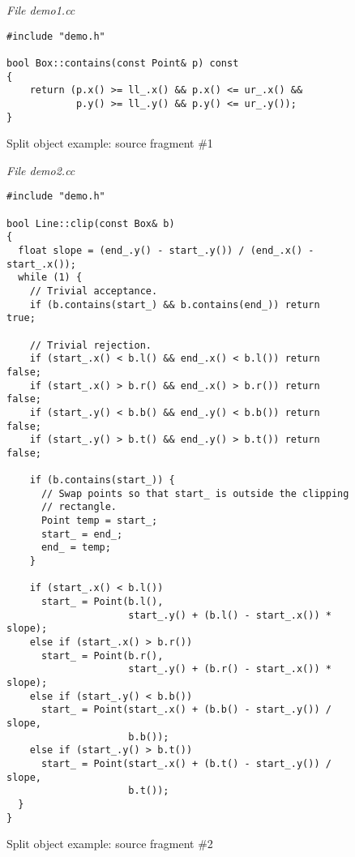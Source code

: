 \vspace{2cm}
\begin{figure}[ht]
\textit{File demo1.cc}
\begin{lstlisting}
#include "demo.h"

bool Box::contains(const Point& p) const
{
    return (p.x() >= ll_.x() && p.x() <= ur_.x() &&
            p.y() >= ll_.y() && p.y() <= ur_.y());
}
\end{lstlisting}
\caption{Split object example: source fragment \#1}
\label{fig:splitobjectexamplesourcefragment1}
\end{figure}

\begin{figure}[ht]
\textit{File demo2.cc}
\begin{lstlisting}
#include "demo.h"

bool Line::clip(const Box& b)
{
  float slope = (end_.y() - start_.y()) / (end_.x() - start_.x());
  while (1) {
    // Trivial acceptance.
    if (b.contains(start_) && b.contains(end_)) return true;

    // Trivial rejection.
    if (start_.x() < b.l() && end_.x() < b.l()) return false;
    if (start_.x() > b.r() && end_.x() > b.r()) return false;
    if (start_.y() < b.b() && end_.y() < b.b()) return false;
    if (start_.y() > b.t() && end_.y() > b.t()) return false;

    if (b.contains(start_)) {
      // Swap points so that start_ is outside the clipping 
      // rectangle.
      Point temp = start_;
      start_ = end_;
      end_ = temp;
    }

    if (start_.x() < b.l())
      start_ = Point(b.l(), 
                     start_.y() + (b.l() - start_.x()) * slope);
    else if (start_.x() > b.r())
      start_ = Point(b.r(), 
                     start_.y() + (b.r() - start_.x()) * slope);
    else if (start_.y() < b.b())
      start_ = Point(start_.x() + (b.b() - start_.y()) / slope, 
                     b.b());
    else if (start_.y() > b.t())
      start_ = Point(start_.x() + (b.t() - start_.y()) / slope, 
                     b.t());
  }
}
\end{lstlisting}
\caption{Split object example: source fragment \#2}
\label{fig:splitobjectexamplesourcefragment2}
\end{figure}

